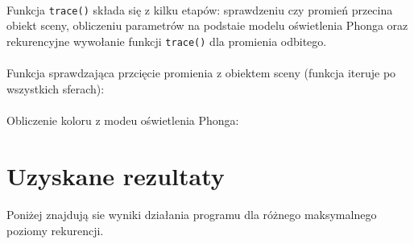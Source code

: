 \documentclass[wide,a4paper,titlepage,12pt] {article}
\begin{document}
  \paragraph{}
  

  \paragraph{}
  Funkcja \texttt{trace()} składa się z kilku etapów: sprawdzeniu czy promień przecina obiekt sceny, obliczeniu parametrów na podstaie modelu oświetlenia Phonga oraz rekurencyjne wywołanie funkcji \texttt{trace()} dla promienia odbitego.
  \paragraph{}
  

  \paragraph{}
  Funkcja sprawdzająca przcięcie promienia z obiektem sceny (funkcja iteruje po wszystkich sferach):
  \paragraph{}
  

  \paragraph{}
  Obliczenie koloru z modeu oświetlenia Phonga:
  \paragraph{}
  

  \newpage
  \section{Uzyskane rezultaty}
  \paragraph{}
  Poniżej znajdują sie wyniki działania programu dla różnego maksymalnego poziomy rekurencji.
\end{document}
